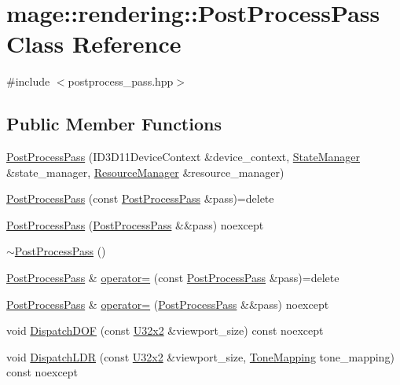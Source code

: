 \hypertarget{classmage_1_1rendering_1_1_post_process_pass}{}\section{mage\+:\+:rendering\+:\+:Post\+Process\+Pass Class Reference}
\label{classmage_1_1rendering_1_1_post_process_pass}


{\ttfamily \#include $<$postprocess\+\_\+pass.\+hpp$>$}

\subsection*{Public Member Functions}
\begin{DoxyCompactItemize}
\item 
\hyperlink{classmage_1_1rendering_1_1_post_process_pass_aa7989cc618c40d64e6e86f1aa8576dff}{Post\+Process\+Pass} (I\+D3\+D11\+Device\+Context \&device\+\_\+context, \hyperlink{classmage_1_1rendering_1_1_state_manager}{State\+Manager} \&state\+\_\+manager, \hyperlink{classmage_1_1rendering_1_1_resource_manager}{Resource\+Manager} \&resource\+\_\+manager)
\item 
\hyperlink{classmage_1_1rendering_1_1_post_process_pass_a5980123845352eb3071e2fde203469fc}{Post\+Process\+Pass} (const \hyperlink{classmage_1_1rendering_1_1_post_process_pass}{Post\+Process\+Pass} \&pass)=delete
\item 
\hyperlink{classmage_1_1rendering_1_1_post_process_pass_aa57a8a38643fc76d0cdae8106c3de7e3}{Post\+Process\+Pass} (\hyperlink{classmage_1_1rendering_1_1_post_process_pass}{Post\+Process\+Pass} \&\&pass) noexcept
\item 
\hyperlink{classmage_1_1rendering_1_1_post_process_pass_a41e82fe23fdc3a5726989edb0bb334ea}{$\sim$\+Post\+Process\+Pass} ()
\item 
\hyperlink{classmage_1_1rendering_1_1_post_process_pass}{Post\+Process\+Pass} \& \hyperlink{classmage_1_1rendering_1_1_post_process_pass_ace844a6fbc47cc0470642e48361efacd}{operator=} (const \hyperlink{classmage_1_1rendering_1_1_post_process_pass}{Post\+Process\+Pass} \&pass)=delete
\item 
\hyperlink{classmage_1_1rendering_1_1_post_process_pass}{Post\+Process\+Pass} \& \hyperlink{classmage_1_1rendering_1_1_post_process_pass_a72e638460796e9613f232a6cbf118378}{operator=} (\hyperlink{classmage_1_1rendering_1_1_post_process_pass}{Post\+Process\+Pass} \&\&pass) noexcept
\item 
void \hyperlink{classmage_1_1rendering_1_1_post_process_pass_a5a580293635c790deb09e958724021c2}{Dispatch\+D\+OF} (const \hyperlink{namespacemage_a88e05bff0300120c013285d3dcad95c5}{U32x2} \&viewport\+\_\+size) const noexcept
\item 
void \hyperlink{classmage_1_1rendering_1_1_post_process_pass_a8736c2eb9872035c2e5d109681f72146}{Dispatch\+L\+DR} (const \hyperlink{namespacemage_a88e05bff0300120c013285d3dcad95c5}{U32x2} \&viewport\+\_\+size, \hyperlink{namespacemage_1_1rendering_a789e4b7d9a8cc831b065e9c6bb7430e9}{Tone\+Mapping} tone\+\_\+mapping) const noexcept
\end{DoxyCompactItemize}
